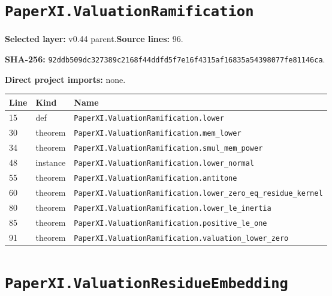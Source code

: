 \documentclass[10pt,oneside]{book}
\begin{document}
\section{\texorpdfstring{\nolinkurl{PaperXI.ValuationRamification}}{PaperXI.ValuationRamification}}\label{module:PaperXI.ValuationRamification}

\textbf{Selected layer:} v0.44 parent.\quad\textbf{Source lines:} 96.\par\textbf{SHA-256:} {\scriptsize\nolinkurl{92ddb509dc327389c2168f44ddfd5f7e16f4315af16835a54398077fe81146ca}}.


\textbf{Direct project imports:} none.

\begin{longtable}{@{}p{}p{}p{}@{}}\toprule Line&Kind&Name\\\midrule\endhead

15&def&\nolinkurl{PaperXI.ValuationRamification.lower}\\

30&theorem&\nolinkurl{PaperXI.ValuationRamification.mem_lower}\\

34&theorem&\nolinkurl{PaperXI.ValuationRamification.smul_mem_power}\\

48&instance&\nolinkurl{PaperXI.ValuationRamification.lower_normal}\\

55&theorem&\nolinkurl{PaperXI.ValuationRamification.antitone}\\

60&theorem&\nolinkurl{PaperXI.ValuationRamification.lower_zero_eq_residue_kernel}\\

80&theorem&\nolinkurl{PaperXI.ValuationRamification.lower_le_inertia}\\

85&theorem&\nolinkurl{PaperXI.ValuationRamification.positive_le_one}\\

91&theorem&\nolinkurl{PaperXI.ValuationRamification.valuation_lower_zero}\\

\bottomrule\end{longtable}

\section{\texorpdfstring{\nolinkurl{PaperXI.ValuationResidueEmbedding}}{PaperXI.ValuationResidueEmbedding}}\label{module:PaperXI.ValuationResidueEmbedding}
\end{document}
